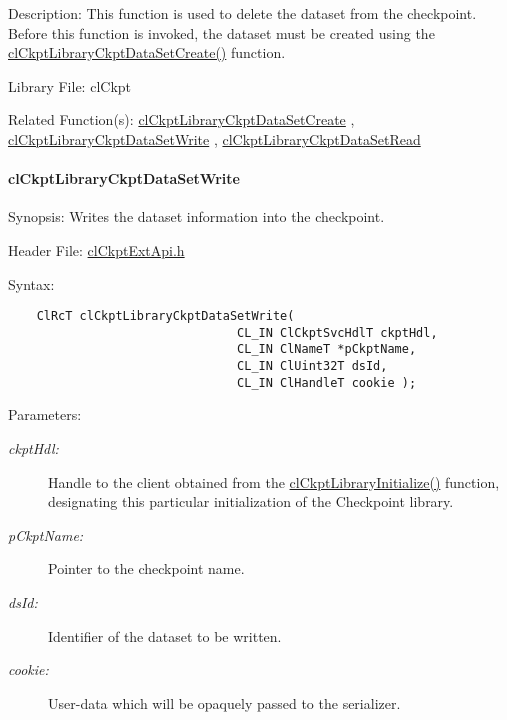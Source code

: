 \begin{Desc}
\item[Description:]This function is used to delete the dataset from the checkpoint. Before this function is invoked, the dataset must be created using the \hyperlink{group__group10_ga6}{cl\-Ckpt\-Library\-Ckpt\-Data\-Set\-Create()} function.\end{Desc}
\begin{Desc}
\item[Library File:]cl\-Ckpt\end{Desc}
\begin{Desc}
\item[Related Function(s):]\hyperlink{group__group10}{cl\-Ckpt\-Library\-Ckpt\-Data\-Set\-Create} , \hyperlink{group__group10}{cl\-Ckpt\-Library\-Ckpt\-Data\-Set\-Write} , \hyperlink{group__group10}{cl\-Ckpt\-Library\-Ckpt\-Data\-Set\-Read} \end{Desc}
\hypertarget{pageckpt207}{}\paragraph{cl\-Ckpt\-Library\-Ckpt\-Data\-Set\-Write}\label{pageckpt207}
\begin{Desc}
\item[Synopsis:]Writes the dataset information into the checkpoint.\end{Desc}
\begin{Desc}
\item[Header File:]\hyperlink{cl_ckpt_ext_api_8h}{cl\-Ckpt\-Ext\-Api.h}\end{Desc}
\begin{Desc}
\item[Syntax:]

\footnotesize\begin{verbatim}    ClRcT clCkptLibraryCkptDataSetWrite(
                                CL_IN ClCkptSvcHdlT ckptHdl,
                                CL_IN ClNameT *pCkptName,
                                CL_IN ClUint32T dsId,
                                CL_IN ClHandleT cookie );
\end{verbatim}
\normalsize
\end{Desc}
\begin{Desc}
\item[Parameters:]
\begin{description}
\item[{\em ckpt\-Hdl:}]Handle to the client obtained from the \hyperlink{group__group10_ga2}{cl\-Ckpt\-Library\-Initialize()} function, designating this particular initialization of the Checkpoint library. \item[{\em p\-Ckpt\-Name:}]Pointer to the checkpoint name. \item[{\em ds\-Id:}]Identifier of the dataset to be written. \item[{\em cookie:}]User-data which will be opaquely passed to the serializer.\end{description}
\end{Desc}
